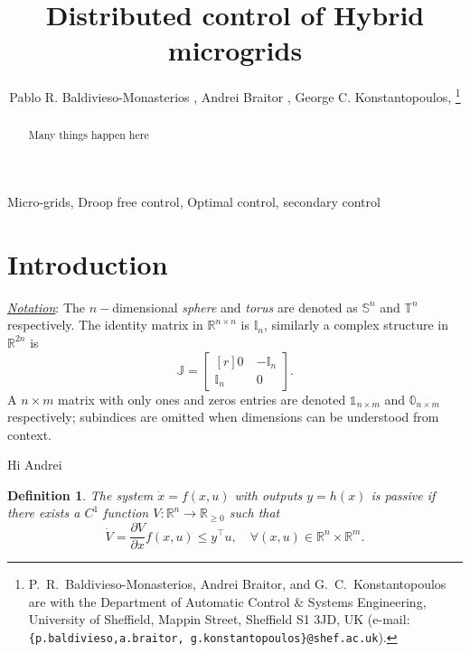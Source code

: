 \documentclass[journal, final, letterpaper]{IEEEtran}
\newtheorem{definition}{Definition}[section]
\newcommand{\ts}[1]{{\textnormal{#1}}}
\newcommand{\Rset}{\mathbb{R}}
\newcommand{\mbb}{\mathbb}
\begin{document}
\title{Distributed control of Hybrid microgrids}

\author{Pablo R. Baldivieso-Monasterios , Andrei Braitor , George C. Konstantopoulos, 
\thanks{P.~R.~Baldivieso-Monasterios, Andrei Braitor, and G.~C.~Konstantopoulos are with the Department of Automatic Control \& Systems Engineering,
      University of Sheffield, Mappin Street, Sheffield S1 3JD, UK
      (e-mail: \texttt{\{p.baldivieso,a.braitor, g.konstantopoulos\}@shef.ac.uk}).}}


\maketitle

\begin{abstract}
Many things happen here
\end{abstract}
%
\begin{IEEEkeywords}
Micro-grids, Droop free control, Optimal control, secondary control
\end{IEEEkeywords}
%
\section{Introduction}
\label{sec:introduction}

\underline{\emph{Notation}}: The $n-$dimensional \emph{sphere} and \emph{torus} are denoted as $\mbb{S}^n$ and $\mbb{T}^{n}$ respectively. The identity matrix in $\Rset^{n\times n}$ is $\mbb{I}_n$, similarly a complex structure in $\Rset^{2n}$ is \[\mbb{J} =
  \begin{bmatrix*}[r]
    0~ &-\mbb{I}_n \\
    \mbb{I}_n & 0~ 
  \end{bmatrix*}
  .\]A $n\times m$ matrix with only ones and zeros entries are denoted $\mbb{1}_{n\times m}$ and $\mbb{0}_{n\times m}$ respectively; subindices are omitted when dimensions can be understood from context.

Hi Andrei

\begin{definition}
The system $\dot{x} = f(x,u)$ with outputs $y = h(x)$ is passive if there exists a $C^{1}$ function $V:\Rset^n\to\Rset_{\geq0}$ such that
%
\begin{equation*}
 \dot{V} = \frac{\partial V}{\partial x}f(x,u) \leq y^\top u,\quad \forall (x,u)\in\Rset^{n}\times\Rset^{m}.
\end{equation*}
% 
\label{def:passivity}	
\end{definition}
\end{document}
